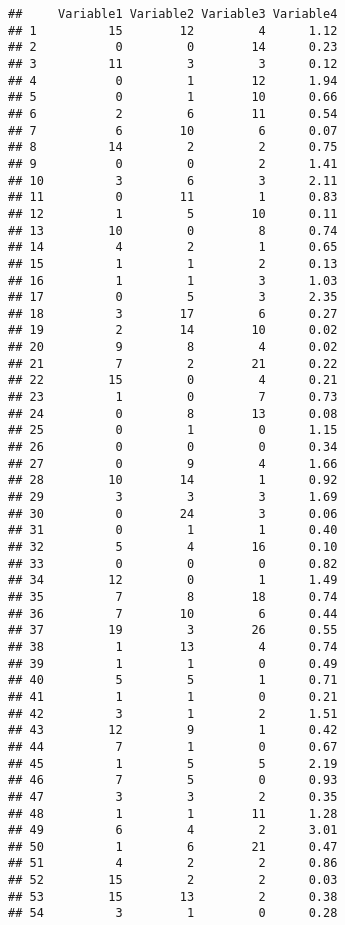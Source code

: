 \documentclass[]{article}
\begin{document}
\begin{verbatim}
##     Variable1 Variable2 Variable3 Variable4
## 1          15        12         4      1.12
## 2           0         0        14      0.23
## 3          11         3         3      0.12
## 4           0         1        12      1.94
## 5           0         1        10      0.66
## 6           2         6        11      0.54
## 7           6        10         6      0.07
## 8          14         2         2      0.75
## 9           0         0         2      1.41
## 10          3         6         3      2.11
## 11          0        11         1      0.83
## 12          1         5        10      0.11
## 13         10         0         8      0.74
## 14          4         2         1      0.65
## 15          1         1         2      0.13
## 16          1         1         3      1.03
## 17          0         5         3      2.35
## 18          3        17         6      0.27
## 19          2        14        10      0.02
## 20          9         8         4      0.02
## 21          7         2        21      0.22
## 22         15         0         4      0.21
## 23          1         0         7      0.73
## 24          0         8        13      0.08
## 25          0         1         0      1.15
## 26          0         0         0      0.34
## 27          0         9         4      1.66
## 28         10        14         1      0.92
## 29          3         3         3      1.69
## 30          0        24         3      0.06
## 31          0         1         1      0.40
## 32          5         4        16      0.10
## 33          0         0         0      0.82
## 34         12         0         1      1.49
## 35          7         8        18      0.74
## 36          7        10         6      0.44
## 37         19         3        26      0.55
## 38          1        13         4      0.74
## 39          1         1         0      0.49
## 40          5         5         1      0.71
## 41          1         1         0      0.21
## 42          3         1         2      1.51
## 43         12         9         1      0.42
## 44          7         1         0      0.67
## 45          1         5         5      2.19
## 46          7         5         0      0.93
## 47          3         3         2      0.35
## 48          1         1        11      1.28
## 49          6         4         2      3.01
## 50          1         6        21      0.47
## 51          4         2         2      0.86
## 52         15         2         2      0.03
## 53         15        13         2      0.38
## 54          3         1         0      0.28

\end{verbatim}
\end{document}
